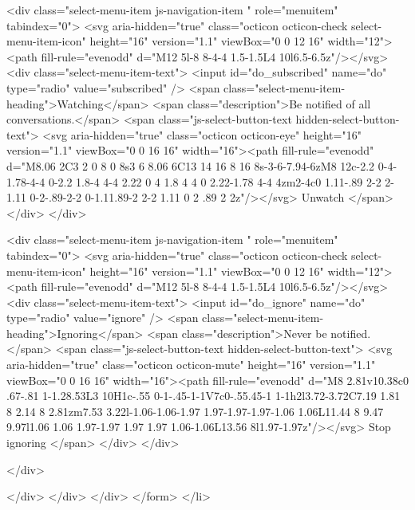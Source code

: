                 <div class="select-menu-item js-navigation-item " role="menuitem" tabindex="0">
                  <svg aria-hidden="true" class="octicon octicon-check select-menu-item-icon" height="16" version="1.1" viewBox="0 0 12 16" width="12"><path fill-rule="evenodd" d="M12 5l-8 8-4-4 1.5-1.5L4 10l6.5-6.5z"/></svg>
                  <div class="select-menu-item-text">
                    <input id="do_subscribed" name="do" type="radio" value="subscribed" />
                    <span class="select-menu-item-heading">Watching</span>
                    <span class="description">Be notified of all conversations.</span>
                    <span class="js-select-button-text hidden-select-button-text">
                      <svg aria-hidden="true" class="octicon octicon-eye" height="16" version="1.1" viewBox="0 0 16 16" width="16"><path fill-rule="evenodd" d="M8.06 2C3 2 0 8 0 8s3 6 8.06 6C13 14 16 8 16 8s-3-6-7.94-6zM8 12c-2.2 0-4-1.78-4-4 0-2.2 1.8-4 4-4 2.22 0 4 1.8 4 4 0 2.22-1.78 4-4 4zm2-4c0 1.11-.89 2-2 2-1.11 0-2-.89-2-2 0-1.11.89-2 2-2 1.11 0 2 .89 2 2z"/></svg>
                      Unwatch
                    </span>
                  </div>
                </div>

                <div class="select-menu-item js-navigation-item " role="menuitem" tabindex="0">
                  <svg aria-hidden="true" class="octicon octicon-check select-menu-item-icon" height="16" version="1.1" viewBox="0 0 12 16" width="12"><path fill-rule="evenodd" d="M12 5l-8 8-4-4 1.5-1.5L4 10l6.5-6.5z"/></svg>
                  <div class="select-menu-item-text">
                    <input id="do_ignore" name="do" type="radio" value="ignore" />
                    <span class="select-menu-item-heading">Ignoring</span>
                    <span class="description">Never be notified.</span>
                    <span class="js-select-button-text hidden-select-button-text">
                      <svg aria-hidden="true" class="octicon octicon-mute" height="16" version="1.1" viewBox="0 0 16 16" width="16"><path fill-rule="evenodd" d="M8 2.81v10.38c0 .67-.81 1-1.28.53L3 10H1c-.55 0-1-.45-1-1V7c0-.55.45-1 1-1h2l3.72-3.72C7.19 1.81 8 2.14 8 2.81zm7.53 3.22l-1.06-1.06-1.97 1.97-1.97-1.97-1.06 1.06L11.44 8 9.47 9.97l1.06 1.06 1.97-1.97 1.97 1.97 1.06-1.06L13.56 8l1.97-1.97z"/></svg>
                      Stop ignoring
                    </span>
                  </div>
                </div>

              </div>

            </div>
          </div>
        </div>
</form>
  </li>

